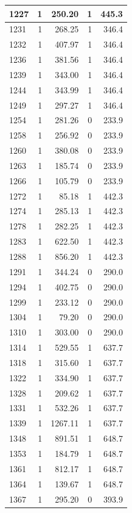 \documentclass[
  spanish,
  12pt,
]{book}
\begin{document}
\begin{tabular}{l|r|r|r|r}
\hline
1227 & 1 & 250.20 & 1 & 445.3\\
\hline
1231 & 1 & 268.25 & 1 & 346.4\\
\hline
1232 & 1 & 407.97 & 1 & 346.4\\
\hline
1236 & 1 & 381.56 & 1 & 346.4\\
\hline
1239 & 1 & 343.00 & 1 & 346.4\\
\hline
1244 & 1 & 343.99 & 1 & 346.4\\
\hline
1249 & 1 & 297.27 & 1 & 346.4\\
\hline
1254 & 1 & 281.26 & 0 & 233.9\\
\hline
1258 & 1 & 256.92 & 0 & 233.9\\
\hline
1260 & 1 & 380.08 & 0 & 233.9\\
\hline
1263 & 1 & 185.74 & 0 & 233.9\\
\hline
1266 & 1 & 105.79 & 0 & 233.9\\
\hline
1272 & 1 & 85.18 & 1 & 442.3\\
\hline
1274 & 1 & 285.13 & 1 & 442.3\\
\hline
1278 & 1 & 282.25 & 1 & 442.3\\
\hline
1283 & 1 & 622.50 & 1 & 442.3\\
\hline
1288 & 1 & 856.20 & 1 & 442.3\\
\hline
1291 & 1 & 344.24 & 0 & 290.0\\
\hline
1294 & 1 & 402.75 & 0 & 290.0\\
\hline
1299 & 1 & 233.12 & 0 & 290.0\\
\hline
1304 & 1 & 79.20 & 0 & 290.0\\
\hline
1310 & 1 & 303.00 & 0 & 290.0\\
\hline
1314 & 1 & 529.55 & 1 & 637.7\\
\hline
1318 & 1 & 315.60 & 1 & 637.7\\
\hline
1322 & 1 & 334.90 & 1 & 637.7\\
\hline
1328 & 1 & 209.62 & 1 & 637.7\\
\hline
1331 & 1 & 532.26 & 1 & 637.7\\
\hline
1339 & 1 & 1267.11 & 1 & 637.7\\
\hline
1348 & 1 & 891.51 & 1 & 648.7\\
\hline
1353 & 1 & 184.79 & 1 & 648.7\\
\hline
1361 & 1 & 812.17 & 1 & 648.7\\
\hline
1364 & 1 & 139.67 & 1 & 648.7\\
\hline
1367 & 1 & 295.20 & 0 & 393.9\\

\end{tabular}
\end{document}
